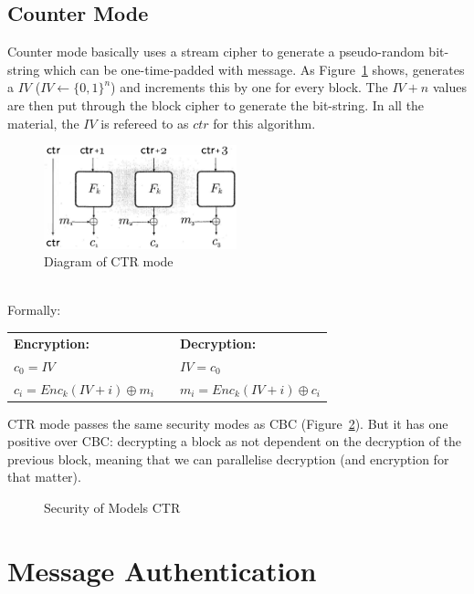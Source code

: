     \subsection{Counter Mode}
    Counter mode basically uses a stream cipher to generate a pseudo-random bit-string which can be one-time-padded with message. As Figure~\ref{fig:ctr} shows, generates a $IV$ ($IV \leftarrow \{0,1\}^n$) and increments this by one for every block. The $IV+n$ values are then put through the block cipher to generate the bit-string. In all the material, the $IV$ is refereed to as $ctr$ for this algorithm.\\
    \begin{figure}[htp!]
        \centering
        \includegraphics[width=0.5\textwidth]{img/ctr.png}
        \caption{Diagram of CTR mode}
        \label{fig:ctr}
    \end{figure}
    \\
    Formally:
    \begin{center}
        \begin{tabular}{lll}
            \textbf{Encryption:} && \textbf{Decryption:}\\
            $c_0 = IV$ && $IV = c_0$\\
            $c_i = Enc_k(IV + i) \oplus m_i$ && $m_i = Enc_k(IV + i) \oplus c_i$
        \end{tabular}
    \end{center}
    CTR mode passes the same security modes as CBC (Figure~\ref{fig:ctr-attacktable}). But it has one positive over CBC: decrypting a block as not dependent on the decryption of the previous block, meaning that we can parallelise decryption (and encryption for that matter).
    \begin{figure}[htp!]
        \centering
        \caption{Security of Models CTR}
        \label{fig:ctr-attacktable}
    \end{figure}

\section{Message Authentication}
